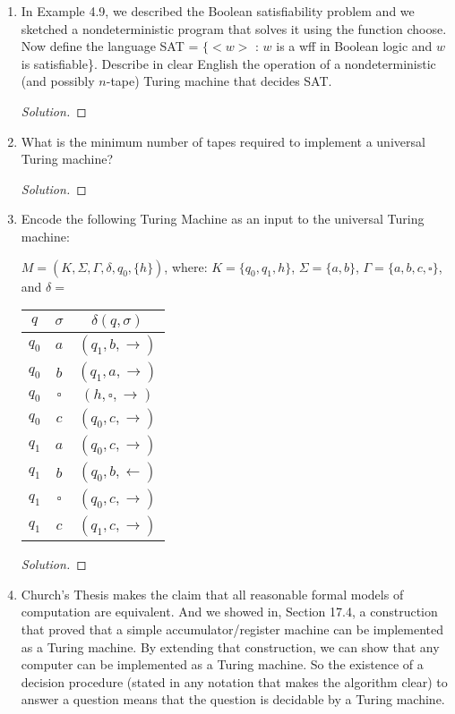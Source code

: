 \documentclass[10pt]{article}
\begin{document}
\begin{enumerate}[1)]
\item
In Example 4.9, we described the Boolean satisfiability problem and we sketched a nondeterministic program 
that solves it using the function choose.  Now define the language SAT = $\{<w>$ : $w$ is a wff in Boolean logic 
and $w$ is satisfiable\}.  Describe in clear English the operation of a nondeterministic (and possibly $n$-tape) Turing 
machine that decides SAT.
\begin{proof}[Solution]
\end{proof}


\item
What is the minimum number of tapes required to implement a universal Turing machine?
\begin{proof}[Solution]
\end{proof}


\item
Encode the following Turing Machine as an input to the universal Turing machine:
\begin{center}
$M = (K, \Sigma, \Gamma, \delta, q_0, \{h\})$, where:   $K = \{q_0, q_1, h\}$,  $\Sigma = \{a, b\}$,  $\Gamma = \{a, b, c, \square\}$, and $\delta =$\\
\vspace{.5cm}
\begin{tabular}{|c|c|c|}
\hline
$q$&$\sigma$&$\delta(q, \sigma)$\\ \hline
$q_0$&$a$&$(q_1, b, \rightarrow)$\\ \hline
$q_0$&$b$&$(q_1, a, \rightarrow)$\\ \hline
$q_0$&$\square$&$(h, \square, \rightarrow)$\\ \hline
$q_0$&$c$&$(q_0, c, \rightarrow)$\\ \hline
$q_1$&$a$&$(q_0, c, \rightarrow)$\\ \hline
$q_1$&$b$&$(q_0, b, \leftarrow)$\\ \hline
$q_1$&$\square$&$(q_0, c, \rightarrow)$\\ \hline
$q_1$&$c$&$(q_1, c, \rightarrow)$\\
\hline
\end{tabular}
\end{center}
\begin{proof}[Solution]
\end{proof}


\item
Church’s Thesis makes the claim that all reasonable formal models of computation are equivalent.  And we showed in, Section 17.4, a construction that proved that a simple accumulator/register machine can be implemented as a Turing machine.  By extending that construction, we can show that any computer can be implemented as a Turing machine.  So the existence of a decision procedure (stated in any notation that makes the algorithm clear) to answer a question means that the question is decidable by a Turing machine.\\


\end{enumerate}
\end{document}
